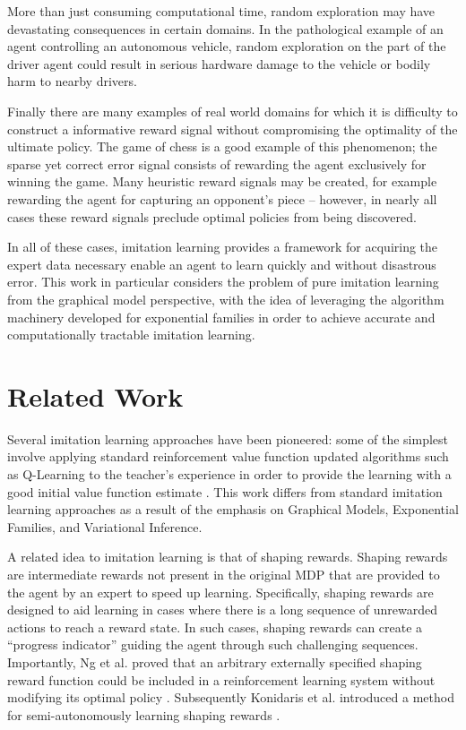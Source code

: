 \documentclass{article} %
\begin{document}
More than just consuming computational time, random exploration may have devastating consequences in certain domains. In the pathological example of an agent controlling an autonomous vehicle, random exploration on the part of the driver agent could result in serious hardware damage to the vehicle or bodily harm to nearby drivers.

Finally there are many examples of real world domains for which it is difficulty to construct a informative reward signal without compromising the optimality of the ultimate policy. The game of chess is a good example of this phenomenon; the sparse yet correct error signal consists of rewarding the agent exclusively for winning the game. Many heuristic reward signals may be created, for example rewarding the agent for capturing an opponent's piece -- however, in nearly all cases these reward signals preclude optimal policies from being discovered.

In all of these cases, imitation learning provides a framework for acquiring the expert data necessary enable an agent to learn quickly and without disastrous error. This work in particular considers the problem of pure imitation learning from the graphical model perspective, with the idea of leveraging the algorithm machinery developed for exponential families in order to achieve accurate and computationally tractable imitation learning.

\section{Related Work}
Several imitation learning approaches have been pioneered: some of the simplest involve applying standard reinforcement value function updated algorithms such as Q-Learning to the teacher's experience in order to provide the learning with a good initial value function estimate \cite{whitehead91,price01}. This work differs from standard imitation learning approaches as a result of the emphasis on Graphical Models, Exponential Families, and Variational Inference.

A related idea to imitation learning is that of shaping rewards. Shaping rewards are intermediate rewards not present in the original MDP that are provided to the agent by an expert to speed up learning. Specifically, shaping rewards are designed to aid learning in cases where there is a long sequence of unrewarded actions to reach a reward state. In such cases, shaping rewards can create a ``progress indicator'' guiding the agent through such challenging sequences. Importantly, Ng et al. proved that an arbitrary externally specified shaping reward function could be included in a reinforcement learning system without modifying its optimal policy \cite{ng99}. Subsequently Konidaris et al. introduced a method for semi-autonomously learning shaping rewards \cite{konidaris06}.
\end{document}
